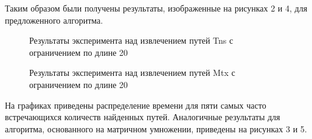 Таким образом были получены результаты, изображенные на рисунках 2 и 4, для предложенного алгоритма.
\begin{figure}[!]
\begin{minipage}[h]{0.49\linewidth}
\caption{Результаты эксперимента над извлечением путей Tns с ограничением по длине 20}
\end{minipage}
\hfill
\begin{minipage}[h]{0.49\linewidth}
\caption{Результаты эксперимента над извлечением путей Mtx с ограничением по длине 20}
\end{minipage}
\end{figure}

На графиках приведены распределение времени для пяти самых часто встречающихся количеств найденных путей. Аналогичные результаты для алгоритма, основанного на матричном умножении, приведены на рисунках 3 и 5.

